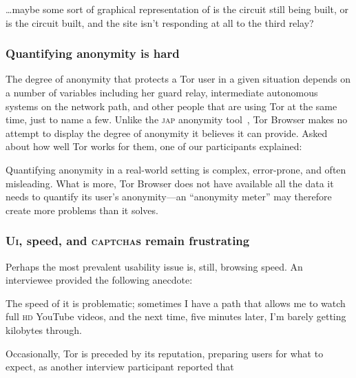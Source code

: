 \begin{displayquote}[P05]
\dots maybe some sort of graphical representation of is the circuit still
being built, or is the circuit built, and the site isn't responding at all to
the third relay?
\end{displayquote}

\subsubsection{Quantifying anonymity is hard}

The degree of anonymity that protects a Tor user in a given situation depends on
a number of variables including her guard relay, intermediate autonomous systems
on the network path, and other people that are using Tor at the same time, just
to name a few.  Unlike the \textsc{jap} anonymity tool~\cite{jap}, Tor Browser
makes no attempt to display the degree of anonymity it believes it can provide.
Asked about how well Tor works for them, one of our participants explained:

Quantifying anonymity in a real-world setting is complex, error-prone, and often
misleading.  What is more, Tor Browser does not have available all the data it
needs to quantify its user's anonymity---an ``anonymity meter'' may therefore
create more problems than it solves.

\subsubsection{\textsc{Ui}, speed, and \textsc{captcha}s remain frustrating}

Perhaps the most prevalent usability issue is, still, browsing speed.  An
interviewee provided the following anecdote:

\begin{displayquote}[P01]
The speed of it is problematic; sometimes I have a path that allows me to watch
full \textsc{hd} YouTube videos, and the next time, five minutes later, I'm
barely getting kilobytes through.
\end{displayquote}

Occasionally, Tor is preceded by its reputation, preparing users for what to
expect, as another interview participant reported that 

